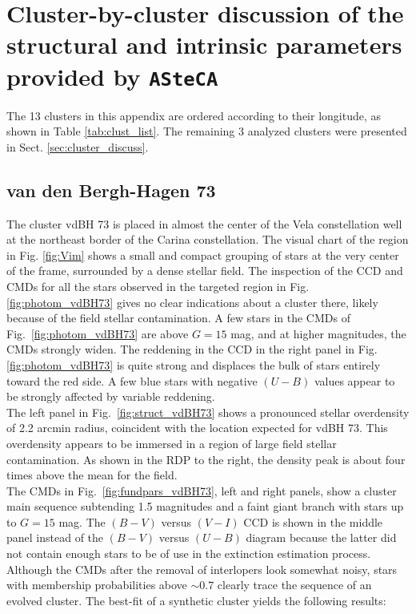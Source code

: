 \documentclass[draft]{aa}
\begin{document}
\appendix

\section{Cluster-by-cluster discussion of the structural and intrinsic
parameters provided by \texttt{ASteCA}}

The 13 clusters in this appendix are ordered according to their
longitude, as shown in Table \ref{tab:clust_list}. The remaining 3
analyzed clusters were presented in Sect. \ref{sec:cluster_discuss}.


\subsection{van den Bergh-Hagen 73}

The cluster vdBH 73 is placed in almost the center of the Vela
constellation well at the northeast border of the Carina constellation. The
visual chart of the region in Fig. \ref{fig:Vim} shows a small and compact
grouping of stars at the very center of the frame, surrounded by a dense stellar
field.
The inspection of the CCD and CMDs for all the stars observed
in the targeted region in Fig. \ref{fig:photom_vdBH73} gives no clear
indications about a cluster there, likely because of the field stellar contamination.
A few stars in the CMDs of Fig.~\ref{fig:photom_vdBH73} are above $G=15$
mag, and at higher magnitudes, the CMDs strongly widen.
The reddening in the CCD in the right panel in Fig. \ref{fig:photom_vdBH73} is quite
strong and displaces the bulk of stars entirely toward the red side. A
few blue stars with negative $(U-B)$ values appear to be strongly affected by
variable reddening.\\

The left panel in Fig.~\ref{fig:struct_vdBH73} shows a pronounced stellar
overdensity of 2.2 arcmin radius, coincident with the location expected for
vdBH 73. This overdensity appears to be immersed in a region of large field
stellar contamination. As shown in the RDP to the right, the density peak is about
four times above the mean for the field.\\

The CMDs in Fig.~\ref{fig:fundpars_vdBH73}, left and right panels, show a cluster main sequence subtending 1.5 magnitudes and a faint giant
branch with stars up to $G=15$ mag.
The $(B-V)$ versus $(V-I)$ CCD is shown in the middle panel instead of the
$(B-V)$ versus $(U-B)$ diagram because the latter did not contain enough stars to
be of use in the extinction estimation process.
Although the CMDs after the removal of interlopers look somewhat noisy, stars with membership probabilities above $\sim0.7$ clearly
trace the sequence of an evolved cluster.
The best-fit of a synthetic cluster yields the following results:
\end{document}
